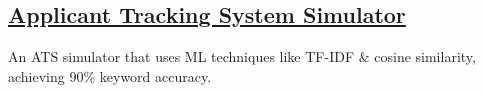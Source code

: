 \subsection{\href{https://github.com/Yashdew/Assessor}{\textbf{Applicant Tracking System Simulator}}}
\begin{zitemize}
\item An ATS simulator that uses ML techniques like TF-IDF \& cosine similarity, achieving 90\% keyword accuracy.
\end{zitemize}
